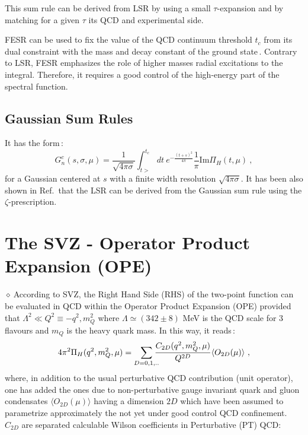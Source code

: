 \documentclass[aps,prd,groupedaddress,nofootinbib]{revtex4-1}
\def\beq{\begin{equation}}
\def\eeq{\end{equation}}
\def\la{\langle}
\def\ra{\rangle}
\def\d{$\diamond~$}
\begin{document}
This sum rule can be derived from LSR by using a small $\tau$-expansion and by matching for a given $\tau$ its QCD and experimental side. 

FESR can be used to fix the value of the QCD continuum threshold $t_c$ from its dual constraint with the mass and decay constant of the ground state\,\cite{FESR1,FESR2}. 
Contrary to LSR, FESR emphasizes the role of higher masses radial excitations to the integral. Therefore, it requires a good control of the high-energy part of the spectral function.
\subsection{Gaussian Sum Rules }
It  has the form\,\cite{FESR1,FESR2}:
\beq
{G}^c_n(s,\sigma,\mu)=\frac{1}{\sqrt{4\pi\sigma}}\int_{t>}^{t_c}dt~e^{-\frac{(t+s)^2}{4\pi}}\frac{1}{\pi} \mbox{Im}\Pi_H(t,\mu)~,
\eeq
for a Gaussian centered at $s$ with a finite width resolution $\sqrt{4\pi\sigma}$. It has been also shown in Ref.\,\cite{FESR1,FESR2} that the LSR can be derived from the Gaussian sum rule using the $\zeta$-prescription.  

\section{The SVZ - Operator Product Expansion (OPE)\label{sec:ope}}
\d According to SVZ, the Right Hand Side (RHS) of the two-point function can be evaluated in QCD within the Operator Product Expansion (OPE) provided that $ \Lambda^2\ll Q^2\equiv -q^2, m_Q^2$ where $\Lambda\simeq (342\pm 8)$ MeV is the QCD scale for 3 flavours and $m_Q$ is the heavy quark mass. In this way, it reads\,:
\beq
4\pi^2\Pi_H(q^2,m_Q^2,\mu)=\sum_{D=0,1,..}\hspace*{-0.25cm}\frac{C_{2D}(q^2,m_Q^2,\mu)}{Q^{2D}}\la O_{2D}(\mu)\ra~, 
\label{eq:ope}
\eeq
where, in addition to the usual perturbative QCD contribution (unit operator), one has added the ones due to non-perturbative gauge invariant quark and gluon condensates $\la O_{2D}(\mu)\ra$ having a dimension $2D$ which have been assumed to  parametrize approximately the not yet under good control QCD confinement.  $C_{2D}$ are separated calculable Wilson coefficients in Perturbative (PT) QCD:
\end{document}
